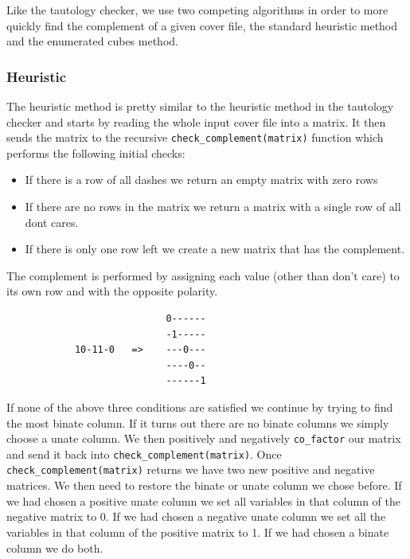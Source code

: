 \documentclass[10pt]{article}
\begin{document}
        Like the tautology checker, we use two competing algorithms in order to
        more quickly find the complement of a given cover file, the standard
        heuristic method and the enumerated cubes method.

        \subsubsection{Heuristic}
            The heuristic method is pretty similar to the heuristic method in the
            tautology checker and starts by reading the whole input cover file into
            a matrix. It then sends the matrix to the recursive
            \texttt{check\_complement(matrix)} function which performs the following
            initial checks:

            \begin{itemize}
                \item If there is a row of all dashes we return an empty matrix with zero rows
                \item If there are no rows in the matrix we return a matrix with a single row of all dont cares.
                \item If there is only one row left we create a new matrix that has the complement.
            \end{itemize}

            The complement is performed by assigning each value (other than don't
            care) to its own row and with the opposite polarity.

            \begin{verbatim}
                            0------
                            -1-----
            10-11-0   =>    ---0---
                            ----0--
                            ------1
            \end{verbatim}

            If none of the above three conditions are satisfied we continue by
            trying to find the most binate column.  If it turns out there are no
            binate columns we simply choose a unate column. We then positively and
            negatively \texttt{co\_factor} our matrix and send it back into
            \texttt{check\_complement(matrix)}. Once
            \texttt{check\_complement(matrix)} returns we have two new positive and
            negative matrices. We then need to restore the binate or unate column
            we chose before. If we had chosen a positive unate column we set all
            variables in that column of the negative matrix to 0. If we had chosen
            a negative unate column we set all the variables in that column of the
            positive matrix to 1. If we had chosen a binate column we do both.
\end{document}
